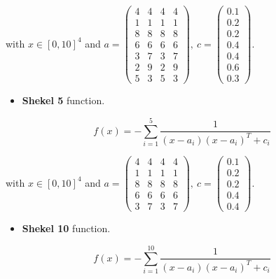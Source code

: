 \documentclass[journal,article,submit,pdftex,moreauthors]{Definitions/mdpi}
\begin{document}
with $x\in[0,10]^{4}$ and $a=\left(\begin{array}{cccc}
4 & 4 & 4 & 4\\
1 & 1 & 1 & 1\\
8 & 8 & 8 & 8\\
6 & 6 & 6 & 6\\
3 & 7 & 3 & 7\\
2 & 9 & 2 & 9\\
5 & 3 & 5 & 3
\end{array}\right),\ c=\left(\begin{array}{c}
0.1\\
0.2\\
0.2\\
0.4\\
0.4\\
0.6\\
0.3
\end{array}\right)$. 
\begin{itemize}
\item \textbf{Shekel 5 }function.
\end{itemize}
\[
f(x)=-\sum_{i=1}^{5}\frac{1}{(x-a_{i})(x-a_{i})^{T}+c_{i}}
\]
 

with $x\in[0,10]^{4}$ and $a=\left(\begin{array}{cccc}
4 & 4 & 4 & 4\\
1 & 1 & 1 & 1\\
8 & 8 & 8 & 8\\
6 & 6 & 6 & 6\\
3 & 7 & 3 & 7
\end{array}\right),\ c=\left(\begin{array}{c}
0.1\\
0.2\\
0.2\\
0.4\\
0.4
\end{array}\right)$. 
\begin{itemize}
\item \textbf{Shekel 10} function.
\end{itemize}
\[
f(x)=-\sum_{i=1}^{10}\frac{1}{(x-a_{i})(x-a_{i})^{T}+c_{i}}
\]
 
\end{document}
